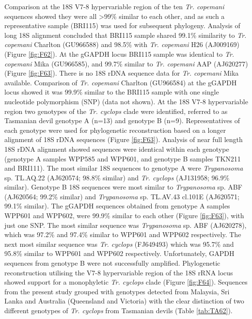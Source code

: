 \documentclass[a4paper, nobind]{templates/ociamthesis}
\begin{document}
Comparison at the 18S V7-8 hypervariable region of the ten \emph{Tr. copemani} sequences showed they were all \textgreater99\% similar to each other, and as such a representative sample (BRI115) was used for subsequent phylogeny. Analysis of long 18S alignment concluded that BRI115 sample shared 99.1\% similarity to \emph{Tr. copemani} Charlton (GU966588) and 98.5\% with \emph{Tr. copemani} H26 (AJ009169) (Figure \ref{fig:F62}). At the gGAPDH locus BRI115 sample was identical to \emph{Tr. copemani} Mika (GU966585), and 99.7\% similar to \emph{Tr. copemani} AAP (AJ620277) (Figure \ref{fig:F63}). There is no 18S rDNA sequence data for \emph{Tr. copemani} Mika available. Comparison of \emph{Tr. copemani} Charlton (GU966584) at the gGAPDH locus showed it was 99.9\% similar to the BRI115 sample with one single nucleotide polymorphism (SNP) (data not shown). At the 18S V7-8 hypervariable region two genotypes of the \emph{Tr. cyclops} clade were identified, referred to as Tasmanian devil genotype A (n=13) and genotype B (n=9). Representatives of each genotype were used for phylogenetic reconstruction based on a longer alignment of 18S rDNA sequences (Figure \ref{fig:F63}). Analysis of near full length 18S rDNA alignment showed sequences were identical within each genotype (genotype A samples WPP585 and WPP601, and genotype B samples TKN211 and BRI111). The most similar 18S sequences to genotype A were \emph{Trypanosoma} sp. TL.AQ.22 (AJ620574; 98.8\% similar) and \emph{Tr. cyclops} (AJ131958; 96.9\% similar). Genotype B 18S sequences were most similar to \emph{Trypanosoma} sp. ABF (AJ620564; 99.2\% similar) and \emph{Trypanosoma} sp. TL.AV.43 cl.101E (AJ620571; 99.1\% similar). The gGAPDH sequences obtained from genotype A samples WPP601 and WPP602, were 99.9\% similar to each other (Figure \ref{fig:F63}), with just one SNP. The most similar sequence was \emph{Trypanosoma} sp. ABF (AJ620278), which was 97.2\% and 97.4\% similar to WPP601 and WPP602 respectively. The next most similar sequence was \emph{Tr. cyclops} (FJ649493) which was 95.7\% and 95.8\% similar to WPP601 and WPP602 respectively. Unfortunately, GAPDH sequences from genotype B were not successfully amplified. Phylogenetic reconstruction utilising the V7-8 hypervariable region of the 18S rRNA locus showed support for a monophyletic \emph{Tr. cyclops} clade (Figure \ref{fig:F64}). Sequences from the present study grouped with genotypes detected from Malaysia, Sri Lanka and Australia (Queensland and Victoria) with the clear distinction of two different genotypes of \emph{Tr. cyclops} from Tasmanian devils (Table \ref{tab:TA62}).
\end{document}
